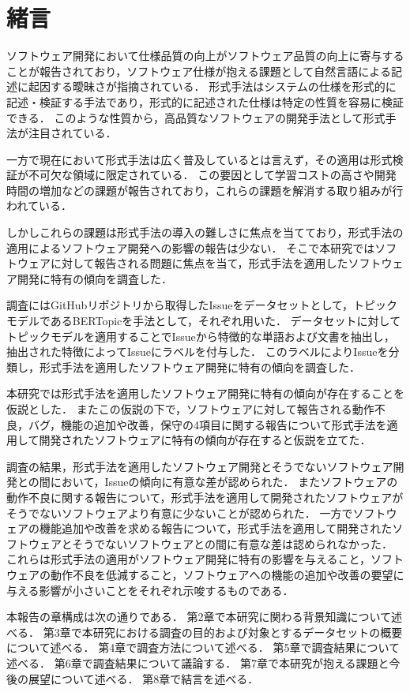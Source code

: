 \documentclass[main]{subfiles}
\begin{document}
\chapter{緒言}

ソフトウェア開発において仕様品質の向上がソフトウェア品質の向上に寄与することが報告されており\cite{knauss:2009}，ソフトウェア仕様が抱える課題として自然言語による記述に起因する曖昧さが指摘されている\cite{kamsties:2005}．
形式手法はシステムの仕様を形式的に記述・検証する手法であり，形式的に記述された仕様は特定の性質を容易に検証できる．
このような性質から，高品質なソフトウェアの開発手法として形式手法が注目されている\cite{aoki:2018}．

一方で現在において形式手法は広く普及しているとは言えず，その適用は形式検証が不可欠な領域に限定されている．
この要因として学習コストの高さや開発時間の増加などの課題が報告されており\cite{reid:2020,kitamura:2021}，これらの課題を解消する取り組みが行われている\cite{huisman:2020,ohnishi:2020}．

しかしこれらの課題は形式手法の導入の難しさに焦点を当てており，形式手法の適用によるソフトウェア開発への影響の報告は少ない．
そこで本研究ではソフトウェアに対して報告される問題に焦点を当て，形式手法を適用したソフトウェア開発に特有の傾向を調査した．

調査にはGitHubリポジトリから取得したIssueをデータセットとして，トピックモデルであるBERTopic\cite{grootendorst:2022}を手法として，それぞれ用いた．
データセットに対してトピックモデルを適用することでIssueから特徴的な単語および文書を抽出し，抽出された特徴によってIssueにラベルを付与した．
このラベルによりIssueを分類し，形式手法を適用したソフトウェア開発に特有の傾向を調査した．

本研究では形式手法を適用したソフトウェア開発に特有の傾向が存在することを仮説とした．
またこの仮説の下で，ソフトウェアに対して報告される動作不良，バグ，機能の追加や改善，保守の4項目に関する報告について形式手法を適用して開発されたソフトウェアに特有の傾向が存在すると仮説を立てた．

調査の結果，形式手法を適用したソフトウェア開発とそうでないソフトウェア開発との間において，Issueの傾向に有意な差が認められた．
またソフトウェアの動作不良に関する報告について，形式手法を適用して開発されたソフトウェアがそうでないソフトウェアより有意に少ないことが認められた．
一方でソフトウェアの機能追加や改善を求める報告について，形式手法を適用して開発されたソフトウェアとそうでないソフトウェアとの間に有意な差は認められなかった．
これらは形式手法の適用がソフトウェア開発に特有の影響を与えること，ソフトウェアの動作不良を低減すること，ソフトウェアへの機能の追加や改善の要望に与える影響が小さいことをそれぞれ示唆するものである．

本報告の章構成は次の通りである．
第2章で本研究に関わる背景知識について述べる．
第3章で本研究における調査の目的および対象とするデータセットの概要について述べる．
第4章で調査方法について述べる．
第5章で調査結果について述べる．
第6章で調査結果について議論する．
第7章で本研究が抱える課題と今後の展望について述べる．
第8章で結言を述べる．
\end{document}
